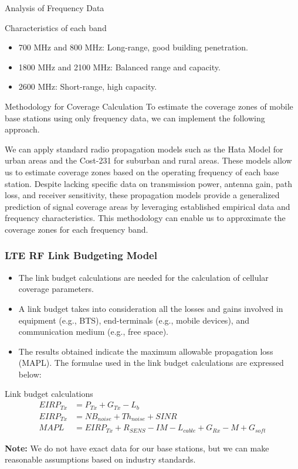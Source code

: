 \begin{frame}{Analysis of Frequency Data}
    \begin{block}{Characteristics of each band}
        \begin{itemize}
            \item 700 MHz and 800 MHz: Long-range, good building penetration.
            \item 1800 MHz and 2100 MHz: Balanced range and capacity.
            \item 2600 MHz: Short-range, high capacity.
        \end{itemize}
    \end{block}

    \begin{block}{Methodology for Coverage Calculation}
        To estimate the coverage zones of mobile base stations using only frequency data, we can implement the following approach. 
        
        We can apply standard radio propagation models such as the Hata Model for urban areas and the Cost-231 for suburban and rural areas.
        These models allow us to estimate coverage zones based on the operating frequency of each base station. Despite lacking specific data on transmission power, antenna gain, path loss, and receiver sensitivity, these propagation models provide a generalized prediction of signal coverage areas by leveraging established empirical data and frequency characteristics.
        This methodology can enable us to approximate the coverage zones for each frequency band.
    \end{block}
\end{frame}

\begin{frame}
    \frametitle{LTE RF Link Budgeting Model}
    \begin{itemize}
        \item The link budget calculations are needed for the calculation of cellular coverage parameters.
        \item A link budget takes into consideration all the losses and gains involved in equipment (e.g., BTS), end-terminals (e.g., mobile devices), and communication medium (e.g., free space).
        \item The results obtained indicate the maximum allowable propagation loss (MAPL). The formulae used in the link budget calculations are expressed below:
    \end{itemize}
    \begin{block}{Link budget calculations}
        \begin{align}
            EIRP_{Tx} &= P_{Tx} + G_{Tx} - L_b \\
            EIRP_{Tx} &= NB_{noise} + Th_{noise} + SINR \\
            MAPL &= EIRP_{Tx} + R_{SENS} - IM - L_{cable} + G_{Rx} - M + G_{soft}
        \end{align}
    \end{block}
    \textbf{Note:} We do not have exact data for our base stations, but we can make reasonable assumptions based on industry standards.
    \end{frame}

